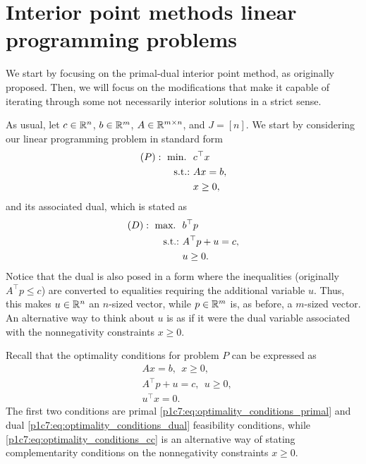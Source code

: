 \section{Interior point methods linear programming problems}
	
We start by focusing on the primal-dual interior point method, as originally proposed. Then, we will focus on the modifications that make it capable of iterating through some not necessarily interior solutions in a strict sense. 	

As usual, let $c \in \mathbb{R}^n$, $b \in \mathbb{R}^m$, $A \in \mathbb{R}^{m \times n}$, and $J = [n]$. We start by considering our linear programming problem in standard form 
	\begin{align*}
		(P) :~ \mathop{\text{min.~}} \ &c^\top x \\
		\mathop{\text{s.t.:~}} &Ax = b,  \\
		&x \ge 0, 
	\end{align*}
	and its associated dual, which is stated as
	\begin{align*}
		(D) :~ \mathop{\text{max.~}} \ &b^\top p \\
		\mathop{\text{s.t.:~}} &A^\top p + u = c, \\
		&u \ge 0. 
	\end{align*}
	Notice that the dual is also posed in a form where the inequalities (originally $A^\top p \le c$) are converted to equalities requiring the additional variable $u$. Thus, this makes $u \in \mathbb{R}^n$ an $n$-sized vector, while $p \in \mathbb{R}^m$ is, as before, a $m$-sized vector. An alternative way to think about $u$ is as if it were the dual variable associated with the nonnegativity constraints $x \ge 0$. 
	
Recall that the optimality conditions for problem $P$ can be expressed as
	\begin{align} 
		& Ax = b, \ \ x \ge 0, \label{p1c7:eq:optimality_conditions_primal} \\
		& A^\top p + u = c, \ \ u \ge 0, \label{p1c7:eq:optimality_conditions_dual} \\
		& u^\top x = 0. \label{p1c7:eq:optimality_conditions_cc}  
	\end{align}
	The first two conditions are primal \eqref{p1c7:eq:optimality_conditions_primal} and dual \eqref{p1c7:eq:optimality_conditions_dual} feasibility conditions, while \eqref{p1c7:eq:optimality_conditions_cc} is an alternative way of stating complementarity conditions on the nonnegativity constraints $x \ge 0$.
	
